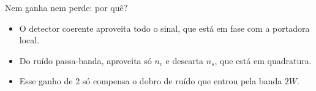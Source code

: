 
\begin{frame}{Nem ganha nem perde: por quê?}

\small
\begin{itemize}
\item<1-> O detector coerente aproveita todo o sinal, que está em fase com a portadora local.
\item<2-> Do ruído passa-banda, aproveita só $n_c$ e descarta $n_s$, que está em quadratura.
\item<3-> Esse ganho de 2 só compensa o dobro de ruído que entrou pela banda $2W$.
\end{itemize}



\end{frame}


